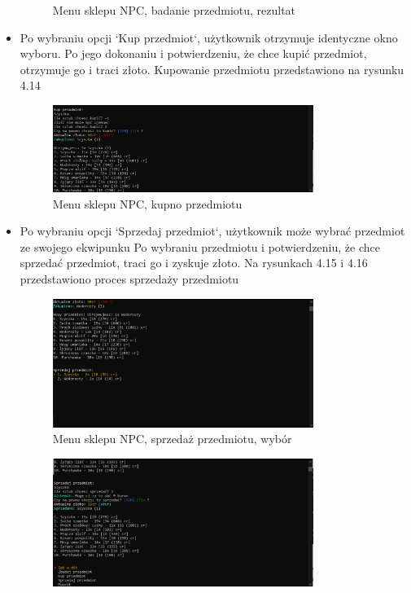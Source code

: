 \begin{itemize}
\begin{figure}[H]
            \caption{Menu sklepu NPC, badanie przedmiotu, rezultat}
            \label{fig:npc_5}
        \end{figure}
    \item Po wybraniu opcji `Kup przedmiot`, użytkownik otrzymuje identyczne okno wyboru. 
    Po jego dokonaniu i potwierdzeniu, że chce kupić przedmiot, otrzymuje go i traci złoto. Kupowanie przedmiotu przedstawiono na rysunku 4.14
        \begin{figure}[H]
            \centering
            \includegraphics[width=0.8\textwidth]{figures/warstwa_uzytkowa/npc_6.png}
            \caption{Menu sklepu NPC, kupno przedmiotu}
            \label{fig:npc_6}
        \end{figure}
    \item Po wybraniu opcji `Sprzedaj przedmiot`, użytkownik może wybrać przedmiot ze swojego ekwipunku
    Po wybraniu przedmiotu i potwierdzeniu, że chce sprzedać przedmiot, traci go i zyskuje złoto.
    Na rysunkach 4.15 i 4.16 przedstawiono proces sprzedaży przedmiotu
        \begin{figure}[H]
            \centering
            \includegraphics[width=0.8\textwidth]{figures/warstwa_uzytkowa/npc_7.png}
            \caption{Menu sklepu NPC, sprzedaż przedmiotu, wybór}
            \label{fig:npc_7}
        \end{figure}
        \begin{figure}[H]
            \centering
            \includegraphics[width=0.8\textwidth]{figures/warstwa_uzytkowa/npc_9.png}

\end{figure}
\end{itemize}
